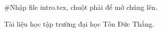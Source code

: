 \documentclass[12pt,a4paper,2sides]{report}
\begin{document}
	
 #Nhập file intro.tex, chuột phải để mở chúng lên.
\newpage
\clearpage
\dominitoc
\tableofcontents %
\newpage
\clearpage
\clearpage
{}
\setcounter{page}{1}
\clearpage

%
%
\begin{thebibliography}{5}
	\bibitem{}  Tài liệu học tập trường đại học Tôn Đức Thắng.
	\bibitem{}
	\bibitem{}
\end{thebibliography}
\end{document}
